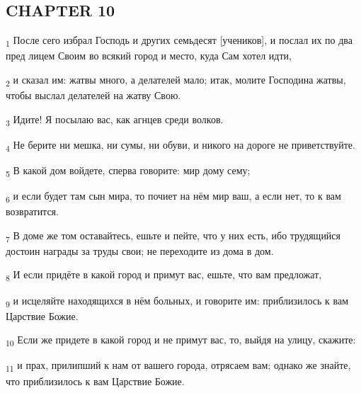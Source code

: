 \subsection{CHAPTER 10}
\begin{tcolorbox}
\textsubscript{1} После сего избрал Господь и других семьдесят [учеников], и послал их по два пред лицем Своим во всякий город и место, куда Сам хотел идти,
\end{tcolorbox}
\begin{tcolorbox}
\textsubscript{2} и сказал им: жатвы много, а делателей мало; итак, молите Господина жатвы, чтобы выслал делателей на жатву Свою.
\end{tcolorbox}
\begin{tcolorbox}
\textsubscript{3} Идите! Я посылаю вас, как агнцев среди волков.
\end{tcolorbox}
\begin{tcolorbox}
\textsubscript{4} Не берите ни мешка, ни сумы, ни обуви, и никого на дороге не приветствуйте.
\end{tcolorbox}
\begin{tcolorbox}
\textsubscript{5} В какой дом войдете, сперва говорите: мир дому сему;
\end{tcolorbox}
\begin{tcolorbox}
\textsubscript{6} и если будет там сын мира, то почиет на нём мир ваш, а если нет, то к вам возвратится.
\end{tcolorbox}
\begin{tcolorbox}
\textsubscript{7} В доме же том оставайтесь, ешьте и пейте, что у них есть, ибо трудящийся достоин награды за труды свои; не переходите из дома в дом.
\end{tcolorbox}
\begin{tcolorbox}
\textsubscript{8} И если придёте в какой город и примут вас, ешьте, что вам предложат,
\end{tcolorbox}
\begin{tcolorbox}
\textsubscript{9} и исцеляйте находящихся в нём больных, и говорите им: приблизилось к вам Царствие Божие.
\end{tcolorbox}
\begin{tcolorbox}
\textsubscript{10} Если же придете в какой город и не примут вас, то, выйдя на улицу, скажите:
\end{tcolorbox}
\begin{tcolorbox}
\textsubscript{11} и прах, прилипший к нам от вашего города, отрясаем вам; однако же знайте, что приблизилось к вам Царствие Божие.
\end{tcolorbox}
